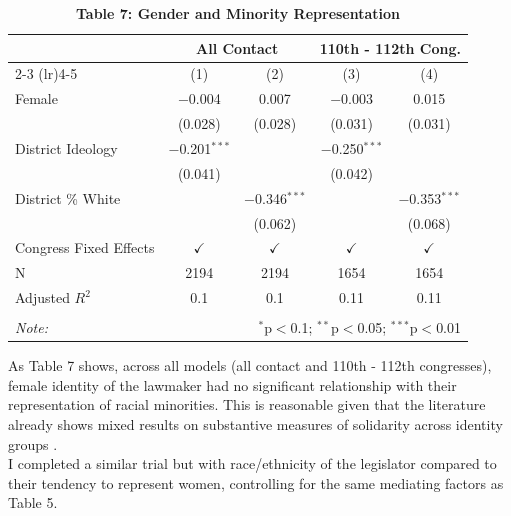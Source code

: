 \documentclass[12pt,letterpaper]{article}
\begin{document}
	\begin{table}[!htbp] \centering 
		\caption{\textbf{Table 7: Gender and Minority Representation}}
		\label{} 
		\begin{tabular}{l@{\hspace{2cm}}cccc} 
			\\[-1.8ex]\hline 
			& \multicolumn{2}{c}{\textbf{All Contact}} &  \multicolumn{2}{c}{\textbf{110th - 112th Cong.}}\\ 
			\cmidrule(lr){2-3} 
			\cmidrule(lr){4-5}
			& (1) & (2) & (3) & (4)\\ 
			\hline
			Female & $-$0.004 & 0.007 & $-$0.003 & 0.015 \\ 
			& (0.028) & (0.028) & (0.031) & (0.031) \\ 
			District Ideology & $-$0.201$^{***}$ &  & $-$0.250$^{***}$ &  \\ 
			& (0.041) &  & (0.042) &  \\ 
			District \% White&  & $-$0.346$^{***}$ &  & $-$0.353$^{***}$ \\ 
			&  & (0.062) &  & (0.068) \\ 
			Congress Fixed Effects & $\checkmark$ & $\checkmark$ & $\checkmark$  & $\checkmark$ \\ 
			N & 2194 & 2194 & 1654 & 1654 \\ 
			Adjusted $R^2$ & 0.1 & 0.1 & 0.11 & 0.11 \\ 
			\hline 
			\hline \\[-1.8ex] 
			\textit{Note:}  & \multicolumn{4}{r}{$^{*}$p$<$0.1; $^{**}$p$<$0.05; $^{***}$p$<$0.01} \\ 
		\end{tabular} 
	\end{table} 
	
	As Table 7 shows, across all models (all contact and 110th - 112th congresses), female identity of the lawmaker had no significant relationship with their representation of racial minorities. This is reasonable given that the literature already shows mixed results on substantive measures of solidarity across identity groups \parencite{hughes_tuch_gender_racial_attitudes}. \\
	
	\newpage
	I completed a similar trial but with race/ethnicity of the legislator compared to their tendency to represent women, controlling for the same mediating factors as Table 5.\\
	
	
	
\end{document}
